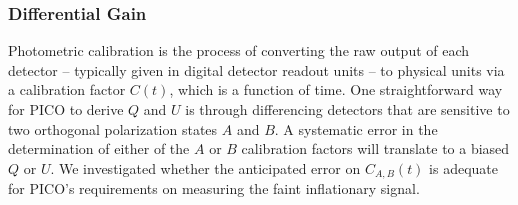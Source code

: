 \documentclass[PICOReport.tex]{subfiles}
\begin{document}



\subsubsection{Differential Gain}
\label{sec:gain_stability}

Photometric calibration is the process of converting the raw output of each detector -- typically given in digital detector readout units -- to physical units via a calibration factor $C(t)$, which is a function of time. One straightforward way for PICO to derive $Q$ and $U$ is through differencing detectors that are sensitive to two orthogonal polarization states $A$ and $B$. A systematic error in the determination of either of the $A$ or $B$ calibration factors will translate to a biased $Q$ or $U$. We investigated whether the anticipated error on $C_{A,B} (t)$ is adequate for PICO's requirements on measuring the faint inflationary signal.  
\end{document}
